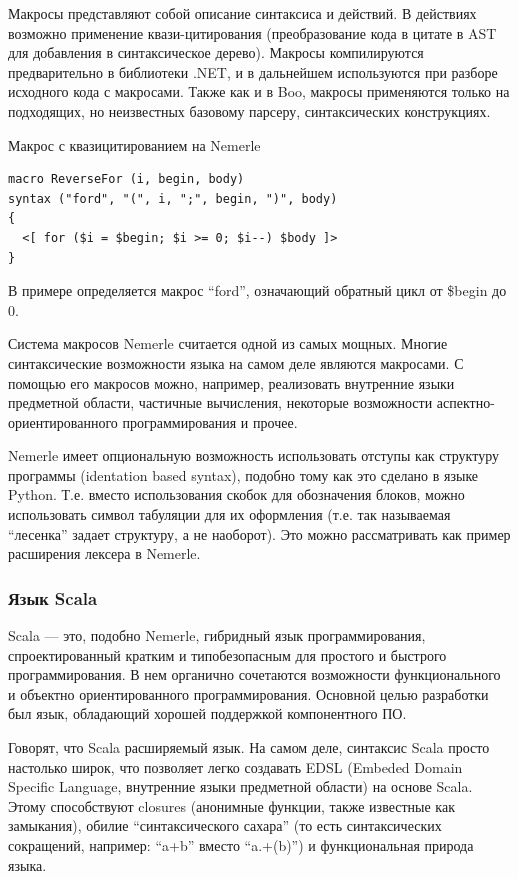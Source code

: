 \documentclass[a4paper,12pt]{article}
\begin{document}
Макросы представляют собой описание синтаксиса и действий. В действиях
возможно применение квази-цитирования (преобразование кода в цитате в AST для
добавления в синтаксическое дерево). Макросы компилируются предварительно в
библиотеки .NET, и в дальнейшем используются при разборе исходного кода с
макросами. Также как и в Boo, макросы применяются только на подходящих, но
неизвестных базовому парсеру, синтаксических конструкциях.

\begin{example}
Макрос с квазицитированием на Nemerle
\end{example}
\begin{verbatim}
macro ReverseFor (i, begin, body) 
syntax ("ford", "(", i, ";", begin, ")", body)
{
  <[ for ($i = $begin; $i >= 0; $i--) $body ]>
}
\end{verbatim}
В примере определяется макрос ``ford'', означающий обратный цикл от \$begin до
0.

Система макросов Nemerle считается одной из самых мощных. Многие
синтаксические возможности языка на самом деле являются макросами. С помощью
его макросов можно, например, реализовать внутренние языки предметной области,
частичные вычисления, некоторые возможности аспектно-ориентированного
программирования и прочее.

Nemerle имеет опциональную возможность использовать отступы как структуру
программы (identation based syntax), подобно тому как это сделано в языке
Python. Т.е. вместо использования скобок для обозначения блоков, можно
использовать символ табуляции для их оформления (т.е. так называемая
``лесенка'' задает структуру, а не наоборот). Это можно рассматривать как
пример расширения лексера в Nemerle.

\subsubsection{Язык Scala}
Scala — это, подобно Nemerle, гибридный язык программирования, спроектированный
кратким и типобезопасным для простого и быстрого программирования. В нем органично
сочетаются возможности функционального и объектно ориентированного
программирования. Основной целью разработки был язык, обладающий хорошей
поддержкой компонентного ПО.

Говорят, что Scala расширяемый язык. На самом деле, синтаксис Scala просто
настолько широк, что позволяет легко создавать EDSL (Embeded Domain Specific
Language, внутренние языки предметной области) на основе Scala. Этому
способствуют closures (анонимные функции, также известные как замыкания), обилие
``синтаксического сахара'' (то есть синтаксических сокращений, например:
``a+b'' вместо ``a.+(b)'') и функциональная природа языка.
\end{document}
